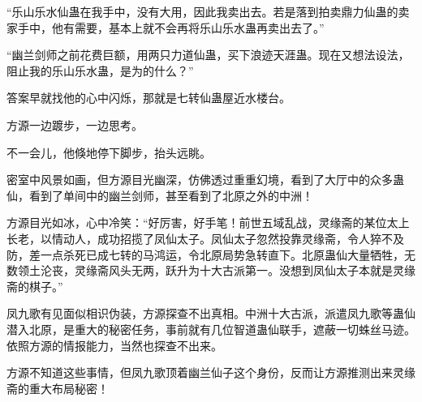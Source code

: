 \begin{this_body}
“乐山乐水仙蛊在我手中，没有大用，因此我卖出去。若是落到拍卖鼎力仙蛊的卖家手中，他有需要，基本上就不会再将乐山乐水蛊再卖出去了。”

“幽兰剑师之前花费巨额，用两只力道仙蛊，买下浪迹天涯蛊。现在又想法设法，阻止我的乐山乐水蛊，是为的什么？”

答案早就找他的心中闪烁，那就是七转仙蛊屋近水楼台。

方源一边踱步，一边思考。

不一会儿，他倏地停下脚步，抬头远眺。

密室中风景如画，但方源目光幽深，仿佛透过重重幻境，看到了大厅中的众多蛊仙，看到了单间中的幽兰剑师，甚至看到了北原之外的中洲！

方源目光如冰，心中冷笑：“好厉害，好手笔！前世五域乱战，灵缘斋的某位太上长老，以情动人，成功招揽了凤仙太子。凤仙太子忽然投靠灵缘斋，令人猝不及防，差一点杀死已成七转的马鸿运，令北原局势急转直下。北原蛊仙大量牺牲，无数领土沦丧，灵缘斋风头无两，跃升为十大古派第一。没想到凤仙太子本就是灵缘斋的棋子。”

凤九歌有见面似相识伪装，方源探查不出真相。中洲十大古派，派遣凤九歌等蛊仙潜入北原，是重大的秘密任务，事前就有几位智道蛊仙联手，遮蔽一切蛛丝马迹。依照方源的情报能力，当然也探查不出来。

方源不知道这些事情，但凤九歌顶着幽兰仙子这个身份，反而让方源推测出来灵缘斋的重大布局秘密！

\end{this_body}

